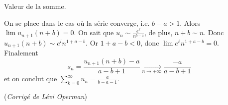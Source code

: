 {{Valeur de la somme.

 
On se place dans le cas où la série converge, i.e. $b-a>1$. Alors $\lim u_{n+1}(n+b) = 0$.
On sait que $u_n\sim\frac{e^\ell}{n^{b-a}}$, de plus, $n+b\sim n$.
Donc $u_{n+1}(n+b)\sim e^ln^{1+a-b}$. Or $1 + a - b < 0$, donc $\lim e^\ell n^{1+a-b} = 0$.
Finalement
\[
s_n = \frac{u_{n+1}(n+b)-a}{a-b+1} \xrightarrow[n \to +\infty]{}
\frac{-a}{a-b+1}
\]
et on conclut que $\sum_{k=0}^\infty{u_n} = \frac{a}{b-a-1}$.

\medskip

(\emph{Corrigé de Lévi Operman})
}
}
